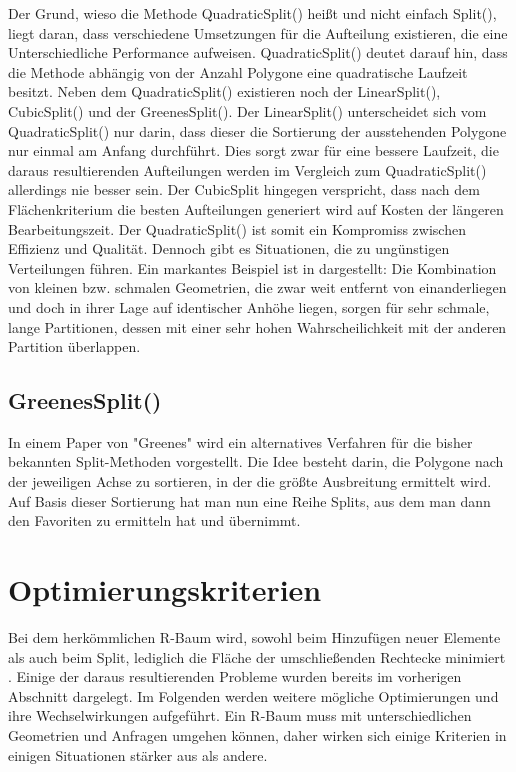 \documentclass[runningheads,a4paper]{llncs}
\begin{document}
{\newline
Der Grund, wieso die Methode QuadraticSplit() heißt und nicht einfach Split(), liegt daran, dass verschiedene Umsetzungen für die Aufteilung existieren, die eine Unterschiedliche Performance aufweisen. QuadraticSplit() deutet darauf hin, dass die Methode abhängig von der Anzahl Polygone eine quadratische Laufzeit besitzt. Neben dem QuadraticSplit() existieren noch der LinearSplit(), CubicSplit() und der GreenesSplit(). Der LinearSplit() unterscheidet sich vom QuadraticSplit() nur darin, dass dieser die Sortierung der ausstehenden Polygone nur einmal am Anfang durchführt. Dies sorgt zwar für eine bessere Laufzeit, die daraus resultierenden Aufteilungen werden im Vergleich zum QuadraticSplit() allerdings nie besser sein. Der CubicSplit hingegen verspricht, dass nach dem Flächenkriterium die besten Aufteilungen generiert wird auf Kosten der längeren Bearbeitungszeit. Der QuadraticSplit() ist somit ein Kompromiss zwischen Effizienz und Qualität. Dennoch gibt es Situationen, die zu ungünstigen Verteilungen führen. Ein markantes Beispiel ist in  dargestellt: Die Kombination von kleinen bzw. schmalen Geometrien, die zwar weit entfernt von einanderliegen und doch in ihrer Lage auf identischer Anhöhe liegen, sorgen für sehr schmale, lange Partitionen, dessen  mit einer sehr hohen Wahrscheilichkeit mit der anderen Partition überlappen.
 

\subsection{GreenesSplit()}
In einem Paper von "Greenes" wird ein alternatives Verfahren für die bisher bekannten Split-Methoden vorgestellt. Die Idee besteht darin, die Polygone nach der jeweiligen Achse zu sortieren, in der die größte Ausbreitung ermittelt wird. Auf Basis dieser Sortierung hat man nun eine Reihe Splits, aus dem man dann den Favoriten zu ermitteln hat und übernimmt.


\section{Optimierungskriterien} %
\label{sec:optimierungskriterien}

	Bei dem herkömmlichen R-Baum wird, sowohl beim Hinzufügen neuer Elemente als auch beim Split, lediglich die Fläche der umschließenden Rechtecke minimiert \citep[vgl.][50-51]{Guttman:1984}. Einige der daraus resultierenden Probleme wurden bereits im vorherigen Abschnitt dargelegt.
	Im Folgenden werden weitere mögliche Optimierungen und ihre Wechselwirkungen aufgeführt. Ein R-Baum muss mit unterschiedlichen Geometrien und Anfragen umgehen können, daher wirken sich einige Kriterien in einigen Situationen stärker aus als andere.

}
\end{document}

